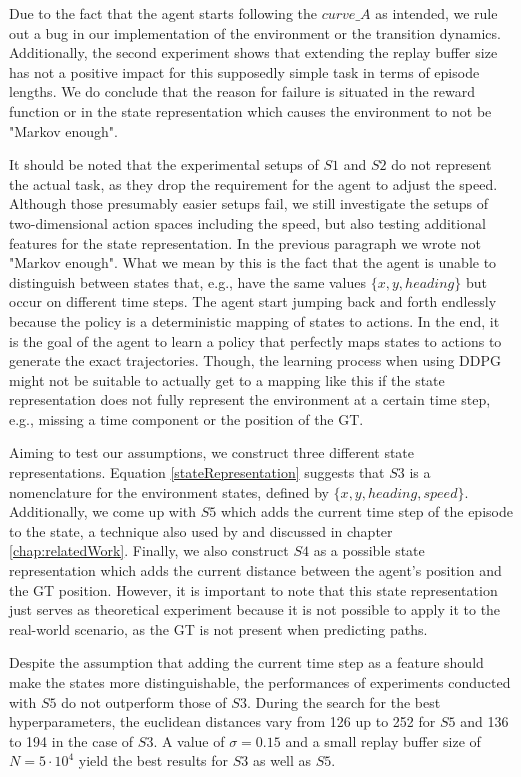 Due to the fact that the agent starts following the $curve\_A$ as intended, we rule out a bug in our implementation of the environment or the transition dynamics. Additionally, the second experiment shows that extending the replay buffer size has not a positive impact for this supposedly simple task in terms of episode lengths. We do conclude that the reason for failure is situated in the reward function or in the state representation which causes the environment to not be "Markov enough".
\par
It should be noted that the experimental setups of $S1$ and $S2$ do not represent the actual task, as they drop the requirement for the agent to adjust the speed. Although those presumably easier setups fail, we still investigate the setups of two-dimensional action spaces including the speed, but also testing additional features for the state representation. In the previous paragraph we wrote not "Markov enough". What we mean by this is the fact that the agent is unable to distinguish between states that, e.g., have the same values $\{x, y, heading\}$ but occur on different time steps. The agent start jumping back and forth endlessly because the policy is a deterministic mapping of states to actions. In the end, it is the goal of the agent to learn a policy that perfectly maps states to actions to generate the exact trajectories. Though, the learning process when using DDPG might not be suitable to actually get to a mapping like this if the state representation does not fully represent the environment at a certain time step, e.g., missing a time component or the position of the GT.
\par
Aiming to test our assumptions, we construct three different state representations. Equation \ref{stateRepresentation} suggests that $S3$ is a nomenclature for the environment states, defined by \linebreak $\{x, y, heading, speed\}$. Additionally, we come up with $S5$ which  adds the current time step of the episode to the state, a technique also used by \cite{liu2019vessel} and discussed in chapter \ref{chap:relatedWork}. Finally, we also construct $S4$ as a possible state representation which adds the current distance between the agent's position and the GT position. However, it is important to note that this state representation just serves as theoretical experiment because it is not possible to apply it to the real-world scenario, as the GT is not present when predicting paths.
\par
Despite the assumption that adding the current time step as a feature should make the states more distinguishable, the performances of experiments conducted with $S5$ do not outperform those of $S3$. During the search for the best hyperparameters, the euclidean distances vary from 126 up to 252 for $S5$ and 136 to 194 in the case of $S3$. A value of $\sigma = 0.15$ and a small replay buffer size of $N=5 \cdot 10^4$ yield the best results for $S3$ as well as $S5$. 
